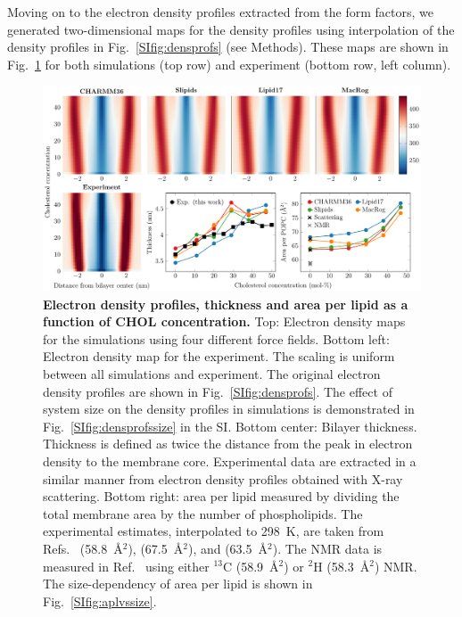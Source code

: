 \documentclass[journal=jctcce]{achemso}
\begin{document}
Moving on to the electron density profiles extracted from the form factors, we generated two-dimensional maps for the density profiles using interpolation of the density profiles in Fig.~\ref{SIfig:densprofs} (see Methods). These maps are shown in Fig.~\ref{fig:densmaps} for both simulations (top row) and experiment (bottom row, left column).

\begin{figure}[htb!]
  \centering
  \includegraphics[width=\linewidth]{../FIGS/densitymaps.pdf}
  \caption{\label{fig:densmaps}%
  \textbf{Electron density profiles, thickness and area per lipid as a function of CHOL concentration.}
  Top: Electron density maps for the simulations using four different force fields.
  Bottom left: Electron density map for the experiment. The scaling is uniform between all simulations and experiment. The original electron density profiles are shown in Fig.~\ref{SIfig:densprofs}. The effect of system size on the density profiles in simulations is demonstrated in Fig.~\ref{SIfig:densprofssize} in the SI.
  Bottom center: Bilayer thickness. Thickness is defined as twice the distance from the peak in electron density to the membrane core. Experimental data are extracted in a similar manner from electron density profiles obtained with X-ray scattering.
  Bottom right: area per lipid measured by dividing the total membrane area by the number of phospholipids. The experimental estimates, interpolated to 298~K, are taken from Refs.~ (58.8~\AA{}$^2$),  (67.5~\AA{}$^2$), and  (63.5~\AA{}$^2$). The NMR data is measured in Ref.~ using either $^{13}$C (58.9~\AA{}$^2$) or $^2$H (58.3~\AA{}$^2$) NMR.
  The size-dependency of area per lipid is shown in Fig.~\ref{SIfig:aplvssize}.
  }
\end{figure}
\end{document}
